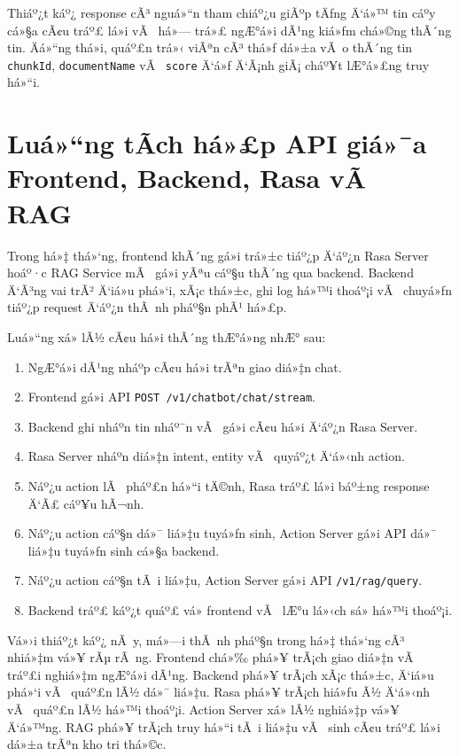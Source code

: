 ﻿\documentclass[12pt,a4paper]{report}
\begin{document}
Thiáº¿t káº¿ response cÃ³ nguá»“n tham chiáº¿u giÃºp tÄƒng Ä‘á»™ tin cáº­y cá»§a cÃ¢u tráº£ lá»i vÃ  há»— trá»£ ngÆ°á»i dÃ¹ng kiá»ƒm chá»©ng thÃ´ng tin. Äá»“ng thá»i, quáº£n trá»‹ viÃªn cÃ³ thá»ƒ dá»±a vÃ o thÃ´ng tin \texttt{chunkId}, \texttt{documentName} vÃ  \texttt{score} Ä‘á»ƒ Ä‘Ã¡nh giÃ¡ cháº¥t lÆ°á»£ng truy há»“i.

\section{Luá»“ng tÃ­ch há»£p API giá»¯a Frontend, Backend, Rasa vÃ  RAG}

Trong há»‡ thá»‘ng, frontend khÃ´ng gá»i trá»±c tiáº¿p Ä‘áº¿n Rasa Server hoáº·c RAG Service mÃ  gá»­i yÃªu cáº§u thÃ´ng qua backend. Backend Ä‘Ã³ng vai trÃ² Ä‘iá»u phá»‘i, xÃ¡c thá»±c, ghi log há»™i thoáº¡i vÃ  chuyá»ƒn tiáº¿p request Ä‘áº¿n thÃ nh pháº§n phÃ¹ há»£p.

Luá»“ng xá»­ lÃ½ cÃ¢u há»i thÃ´ng thÆ°á»ng nhÆ° sau:

\begin{enumerate}
    \item NgÆ°á»i dÃ¹ng nháº­p cÃ¢u há»i trÃªn giao diá»‡n chat.
    \item Frontend gá»i API \texttt{POST /v1/chatbot/chat/stream}.
    \item Backend ghi nháº­n tin nháº¯n vÃ  gá»­i cÃ¢u há»i Ä‘áº¿n Rasa Server.
    \item Rasa Server nháº­n diá»‡n intent, entity vÃ  quyáº¿t Ä‘á»‹nh action.
    \item Náº¿u action lÃ  pháº£n há»“i tÄ©nh, Rasa tráº£ lá»i báº±ng response Ä‘Ã£ cáº¥u hÃ¬nh.
    \item Náº¿u action cáº§n dá»¯ liá»‡u tuyá»ƒn sinh, Action Server gá»i API dá»¯ liá»‡u tuyá»ƒn sinh cá»§a backend.
    \item Náº¿u action cáº§n tÃ i liá»‡u, Action Server gá»i API \texttt{/v1/rag/query}.
    \item Backend tráº£ káº¿t quáº£ vá» frontend vÃ  lÆ°u lá»‹ch sá»­ há»™i thoáº¡i.
\end{enumerate}

Vá»›i thiáº¿t káº¿ nÃ y, má»—i thÃ nh pháº§n trong há»‡ thá»‘ng cÃ³ nhiá»‡m vá»¥ rÃµ rÃ ng. Frontend chá»‰ phá»¥ trÃ¡ch giao diá»‡n vÃ  tráº£i nghiá»‡m ngÆ°á»i dÃ¹ng. Backend phá»¥ trÃ¡ch xÃ¡c thá»±c, Ä‘iá»u phá»‘i vÃ  quáº£n lÃ½ dá»¯ liá»‡u. Rasa phá»¥ trÃ¡ch hiá»ƒu Ã½ Ä‘á»‹nh vÃ  quáº£n lÃ½ há»™i thoáº¡i. Action Server xá»­ lÃ½ nghiá»‡p vá»¥ Ä‘á»™ng. RAG phá»¥ trÃ¡ch truy há»“i tÃ i liá»‡u vÃ  sinh cÃ¢u tráº£ lá»i dá»±a trÃªn kho tri thá»©c.
\end{document}
